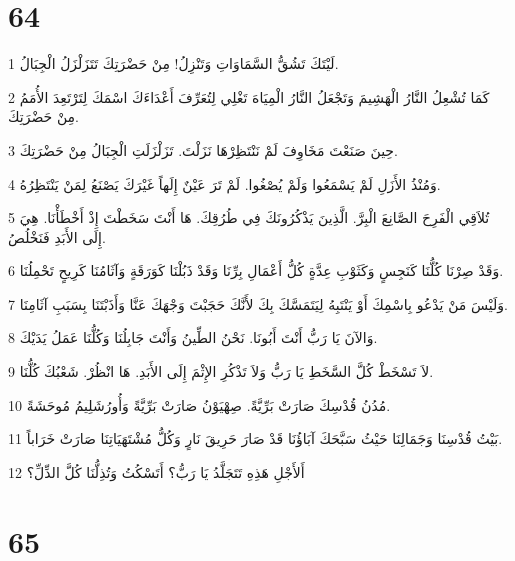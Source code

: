 \chapter{64}

\par 1 لَيْتَكَ تَشُقُّ السَّمَاوَاتِ وَتَنْزِلُ! مِنْ حَضْرَتِكَ تَتَزَلْزَلُ الْجِبَالُ.
\par 2 كَمَا تُشْعِلُ النَّارُ الْهَشِيمَ وَتَجْعَلُ النَّارُ الْمِيَاهَ تَغْلِي لِتُعَرِّفَ أَعْدَاءَكَ اسْمَكَ لِتَرْتَعِدَ الأُمَمُ مِنْ حَضْرَتِكَ.
\par 3 حِينَ صَنَعْتَ مَخَاوِفَ لَمْ نَنْتَظِرْهَا نَزَلْتَ. تَزَلْزَلَتِ الْجِبَالُ مِنْ حَضْرَتِكَ.
\par 4 وَمُنْذُ الأَزَلِ لَمْ يَسْمَعُوا وَلَمْ يُصْغُوا. لَمْ تَرَ عَيْنٌ إِلَهاً غَيْرَكَ يَصْنَعُ لِمَنْ يَنْتَظِرُهُ.
\par 5 تُلاَقِي الْفَرِحَ الصَّانِعَ الْبِرَّ. الَّذِينَ يَذْكُرُونَكَ فِي طُرُقِكَ. هَا أَنْتَ سَخَطْتَ إِذْ أَخْطَأْنَا. هِيَ إِلَى الأَبَدِ فَنَخْلُصُ.
\par 6 وَقَدْ صِرْنَا كُلُّنَا كَنَجِسٍ وَكَثَوْبِ عِدَّةٍ كُلُّ أَعْمَالِ بِرِّنَا وَقَدْ ذَبُلْنَا كَوَرَقَةٍ وَآثَامُنَا كَرِيحٍ تَحْمِلُنَا.
\par 7 وَلَيْسَ مَنْ يَدْعُو بِاسْمِكَ أَوْ يَنْتَبِهُ لِيَتَمَسَّكَ بِكَ لأَنَّكَ حَجَبْتَ وَجْهَكَ عَنَّا وَأَذَبْتَنَا بِسَبَبِ آثَامِنَا.
\par 8 وَالآنَ يَا رَبُّ أَنْتَ أَبُونَا. نَحْنُ الطِّينُ وَأَنْتَ جَابِلُنَا وَكُلُّنَا عَمَلُ يَدَيْكَ.
\par 9 لاَ تَسْخَطْ كُلَّ السَّخَطِ يَا رَبُّ وَلاَ تَذْكُرِ الإِثْمَ إِلَى الأَبَدِ. هَا انْظُرْ. شَعْبُكَ كُلُّنَا.
\par 10 مُدُنُ قُدْسِكَ صَارَتْ بَرِّيَّةً. صِهْيَوْنُ صَارَتْ بَرِّيَّةً وَأُورُشَلِيمُ مُوحَشَةً.
\par 11 بَيْتُ قُدْسِنَا وَجَمَالِنَا حَيْثُ سَبَّحَكَ آبَاؤُنَا قَدْ صَارَ حَرِيقَ نَارٍ وَكُلُّ مُشْتَهَيَاتِنَا صَارَتْ خَرَاباً.
\par 12 أَلأَجْلِ هَذِهِ تَتَجَلَّدُ يَا رَبُّ؟ أَتَسْكُتُ وَتُذِلُّنَا كُلَّ الذِّلِّ؟

\chapter{65}

